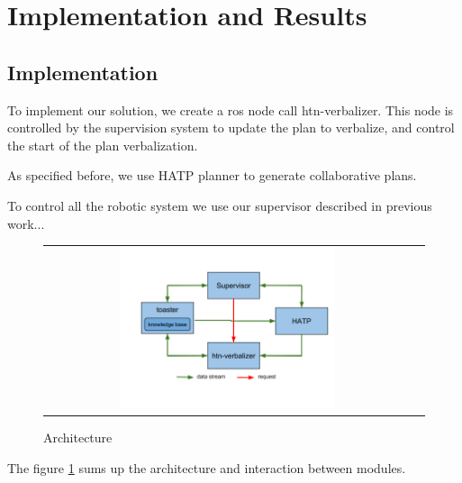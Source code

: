 \documentclass{llncs}
\begin{document}

\section{Implementation and Results}
\subsection{Implementation}
To implement our solution, we create a ros node call htn-verbalizer. This node is controlled by the supervision system to update the plan to verbalize, and control the start of the plan verbalization.

As specified before, we use HATP planner to generate collaborative plans.

To control all the robotic system we use our supervisor described in previous work...

\begin{figure}[ht!]

   \vspace{-12pt}
 \centering
 \begin{tabular}{cc}
  \includegraphics[width=0.6\textwidth]{img/archi.png}
 \end{tabular}
 \caption{Architecture}
 \label{fig:architecture}
   \vspace{-6pt}
 \end{figure}

The figure \ref{fig:architecture}
sums up the architecture and interaction between modules.
\end{document}
